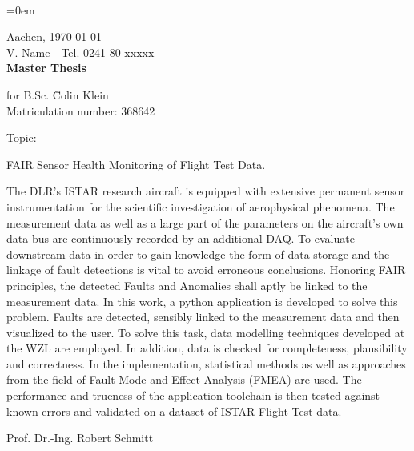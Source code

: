 \pagestyle{empty}
~
\newpage
{}
\parindent=0em

Aachen, \verbosedate\today\\
V. Name - Tel. 0241-80 xxxxx\\[2cm]

{\huge \bf Master Thesis}\\[1cm] %


\begin{tabbing}
for B.Sc. \quad \= Colin Klein\\
\> Matriculation number: 368642\\

	
\end{tabbing}

\begin{minipage}[t]{0.1\textwidth}
Topic: %
\quad
\end{minipage}
\begin{minipage}[t]{0.9\textwidth}
	FAIR Sensor Health Monitoring of Flight Test Data.\\
\end{minipage}

The DLR's ISTAR research aircraft is equipped with extensive permanent sensor instrumentation for the scientific investigation of aerophysical phenomena. The measurement data as well as a large part of the parameters on the aircraft's own data bus are continuously recorded by an additional DAQ. To evaluate downstream data in order to gain knowledge the form of data storage and the linkage of fault detections is vital to avoid erroneous conclusions.
Honoring FAIR principles, the detected Faults and Anomalies shall aptly be linked to the measurement data.
In this work, a python application is developed to solve this problem. Faults are detected, sensibly linked to the measurement data and then visualized to the user.
To solve this task, data modelling techniques developed at the WZL are employed. In addition, data is checked for completeness, plausibility and correctness. In the implementation, statistical methods as well as approaches from the field of Fault Mode and Effect Analysis (FMEA) are used.
The performance and trueness of the application-toolchain is then tested against known errors and validated on a dataset of ISTAR Flight Test data.
\\


\vspace{4cm}

Prof. Dr.-Ing. Robert Schmitt

